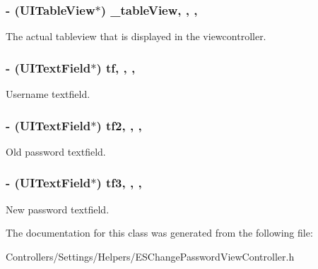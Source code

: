 \subsubsection[{\+\_\+table\+View}]{\setlength{\rightskip}{0pt plus 5cm}-\/ (U\+I\+Table\+View$\ast$) \+\_\+table\+View\hspace{0.3cm}{\ttfamily [read]}, {\ttfamily [write]}, {\ttfamily [nonatomic]}, {\ttfamily [strong]}}\label{interface_e_s_change_password_view_controller_abae47b25e62671a31a24d64c97e40896}
The actual tableview that is displayed in the viewcontroller. \hypertarget{interface_e_s_change_password_view_controller_a034d51b287c59b9fbd13a171cf0f286d}{}
\subsubsection[{tf}]{\setlength{\rightskip}{0pt plus 5cm}-\/ (U\+I\+Text\+Field$\ast$) tf\hspace{0.3cm}{\ttfamily [read]}, {\ttfamily [write]}, {\ttfamily [nonatomic]}, {\ttfamily [strong]}}\label{interface_e_s_change_password_view_controller_a034d51b287c59b9fbd13a171cf0f286d}
Username textfield. \hypertarget{interface_e_s_change_password_view_controller_a07b13e9c8273f5657e8c436df9d1e5d3}{}
\subsubsection[{tf2}]{\setlength{\rightskip}{0pt plus 5cm}-\/ (U\+I\+Text\+Field$\ast$) tf2\hspace{0.3cm}{\ttfamily [read]}, {\ttfamily [write]}, {\ttfamily [nonatomic]}, {\ttfamily [strong]}}\label{interface_e_s_change_password_view_controller_a07b13e9c8273f5657e8c436df9d1e5d3}
Old password textfield. \hypertarget{interface_e_s_change_password_view_controller_a484172c229b1909866c9260d5102d4b2}{}
\subsubsection[{tf3}]{\setlength{\rightskip}{0pt plus 5cm}-\/ (U\+I\+Text\+Field$\ast$) tf3\hspace{0.3cm}{\ttfamily [read]}, {\ttfamily [write]}, {\ttfamily [nonatomic]}, {\ttfamily [strong]}}\label{interface_e_s_change_password_view_controller_a484172c229b1909866c9260d5102d4b2}
New password textfield. 

The documentation for this class was generated from the following file\+:\begin{DoxyCompactItemize}
\item 
Controllers/\+Settings/\+Helpers/E\+S\+Change\+Password\+View\+Controller.\+h\end{DoxyCompactItemize}
